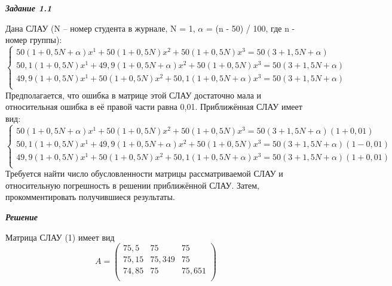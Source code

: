\documentclass[12pt]{article}
\begin{document}
	\begin{center}
		\textbf{\textit{Задание 1.1}}
	\end{center}
	Дана СЛАУ (N – номер студента в журнале, N = 1, $\alpha$ = (n - 50) / 100, где n - номер группы):
	\begin{equation}
		\begin{cases}
			50(1 + 0,5N + \alpha)x^1 + 50(1 + 0,5N)x^2 + 50(1 + 0,5N)x^3 = 50(3 + 1,5N + \alpha)\\
			50,1(1 + 0,5N)x^1 + 49,9(1 + 0,5N + \alpha)x^2 + 50(1 + 0,5N)x^3 = 50(3 + 1,5N + \alpha)\\
			49,9(1 + 0,5N)x^1 + 50(1 + 0,5N)x^2 + 50,1(1 + 0,5N + \alpha)x^3 = 50(3 + 1,5N + \alpha)\\
		\end{cases}
	\end{equation}
	Предполагается, что ошибка в матрице этой СЛАУ достаточно мала и относительная
	ошибка в её правой части равна 0,01. Приближённая СЛАУ имеет вид:
	\begin{equation}
		\begin{cases}
		50(1 + 0,5N + \alpha)x^1 + 50(1 + 0,5N)x^2 + 50(1 + 0,5N)x^3 = 50(3 + 1,5N + \alpha)(1 + 0,01)\\
			50,1(1 + 0,5N)x^1 + 49,9(1 + 0,5N + \alpha)x^2 + 50(1 + 0,5N)x^3 = 50(3 + 1,5N + \alpha)(1 - 0,01)\\
			49,9(1 + 0,5N)x^1 + 50(1 + 0,5N)x^2 + 50,1(1 + 0,5N + \alpha)x^3 = 50(3 + 1,5N + \alpha)(1 + 0,01)\\
		\end{cases}
	\end{equation}
	Требуется найти число обусловленности матрицы рассматриваемой СЛАУ и
	относительную погрешность в решении приближённой СЛАУ. Затем, прокомментировать
	получившиеся результаты.
	\begin{center}
		\textbf{\textit{Решение}}
	\end{center}
	Матрица СЛАУ (1) имеет вид
	\begin{equation*}
		A = \left(
		\begin{array}{ccc}
			75,5 & 75 & 75\\
			75,15 & 75,349 & 75 \\
			74,85 & 75 & 75,651 \\
		\end{array}
		\right)
	\end{equation*}
\end{document}
